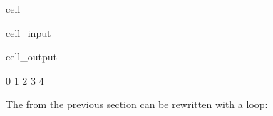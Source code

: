 \documentclass[a4paper,10pt,english]{jupyterBook}
\begin{document}
\begin{sphinxuseclass}{cell}\begin{sphinxVerbatimInput}

\begin{sphinxuseclass}{cell_input}
\begin{sphinxVerbatim}[commandchars=\\\{\}]

\end{sphinxVerbatim}

\end{sphinxuseclass}\end{sphinxVerbatimInput}
\begin{sphinxVerbatimOutput}

\begin{sphinxuseclass}{cell_output}
\begin{sphinxVerbatim}[commandchars=\\\{\}]
0 1 2 3 4 
\end{sphinxVerbatim}

\end{sphinxuseclass}\end{sphinxVerbatimOutput}

\end{sphinxuseclass}
\sphinxAtStartPar
The {\hyperref[\detokenize{text/progtut/while:pendulum-example}]{}} from the previous section can be rewritten with a  loop:
\end{document}
